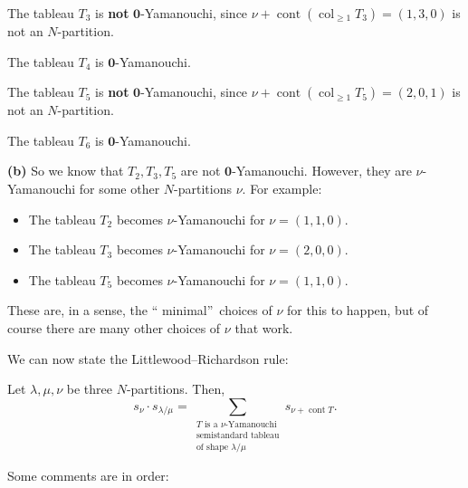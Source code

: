 \begin{example}
The tableau $T_{3}$ is \textbf{not} $\mathbf{0}$-Yamanouchi, since
$\nu+\operatorname*{cont}\left(  \operatorname{col}_{\geq1}T_{3}\right)
=\left(  1,3,0\right)  $ is not an $N$-partition.

The tableau $T_{4}$ is $\mathbf{0}$-Yamanouchi.

The tableau $T_{5}$ is \textbf{not} $\mathbf{0}$-Yamanouchi, since
$\nu+\operatorname*{cont}\left(  \operatorname{col}_{\geq1}T_{5}\right)
=\left(  2,0,1\right)  $ is not an $N$-partition.

The tableau $T_{6}$ is $\mathbf{0}$-Yamanouchi. \medskip

\textbf{(b)} So we know that $T_{2},T_{3},T_{5}$ are not $\mathbf{0}%
$-Yamanouchi. However, they are $\nu$-Yamanouchi for some other $N$-partitions
$\nu$. For example:

\begin{itemize}
\item The tableau $T_{2}$ becomes $\nu$-Yamanouchi for $\nu=\left(
1,1,0\right)  $.

\item The tableau $T_{3}$ becomes $\nu$-Yamanouchi for $\nu=\left(
2,0,0\right)  $.

\item The tableau $T_{5}$ becomes $\nu$-Yamanouchi for $\nu=\left(
1,1,0\right)  $.
\end{itemize}

\noindent These are, in a sense, the \textquotedblleft
minimal\textquotedblright\ choices of $\nu$ for this to happen, but of course
there are many other choices of $\nu$ that work.
\end{example}

We can now state the Littlewood--Richardson rule:

\begin{theorem}
\label{thm.sf.lr-zy}Let $\lambda,\mu,\nu$ be three $N$-partitions. Then,%
\begin{equation}
s_{\nu}\cdot s_{\lambda/\mu}=\sum_{\substack{T\text{ is a }\nu
\text{-Yamanouchi}\\\text{semistandard tableau}\\\text{of shape }\lambda/\mu
}}s_{\nu+\operatorname*{cont}T}. \label{eq.thm.sf.lr-zy.eq}%
\end{equation}

\end{theorem}

Some comments are in order:

